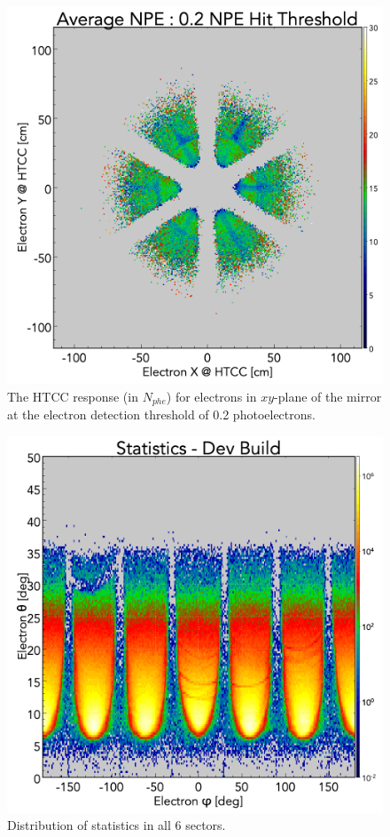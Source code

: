 \begin{figure}[!ht]
    \centering
    \includegraphics[width=1.0\linewidth,trim={0.0cm 0.0cm 0.0cm 1.67cm},clip]{images/avgNPE_XY_Dev_Build_02npe.png}
    \caption{The HTCC response (in $N_{phe}$) for electrons in $xy$-plane of the mirror at the electron detection
      threshold of 0.2 photoelectrons.}
    \label{fig:avgNPE_XY_Dev_Build_02npe}
\end{figure}

\begin{figure}[!ht]
    \centering
    \includegraphics[width=1.0\linewidth,trim={0.0cm 0.0cm 0.0cm 1.67cm},clip]{images/statistics_Theta_Phi_Dev_Build_NO_HOLES.png}
    \caption{Distribution of statistics in all 6 sectors.}
    \label{fig:statistics_Theta_Phi_Dev_Build_NO_HOLES}
\end{figure}

